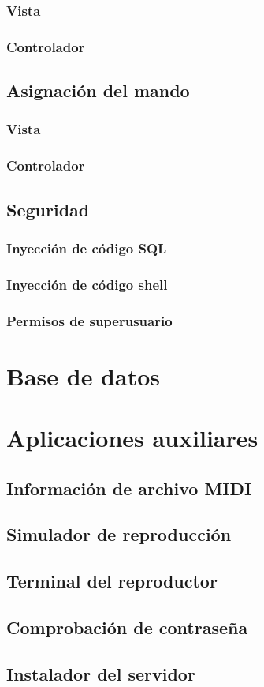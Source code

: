 \subsubsection{Vista}
\subsubsection{Controlador}

\subsection{Asignación del mando}
\subsubsection{Vista}
\subsubsection{Controlador}

\subsection{Seguridad}
\subsubsection{Inyección de código SQL}
\subsubsection{Inyección de código shell}
\subsubsection{Permisos de superusuario}


\section{Base de datos}

\section{Aplicaciones auxiliares}
\subsection{Información de archivo MIDI}
\subsection{Simulador de reproducción}
\label{subsec:simulador_reproduccion}
\subsection{Terminal del reproductor}
\subsection{Comprobación de contraseña}
\subsection{Instalador del servidor}
